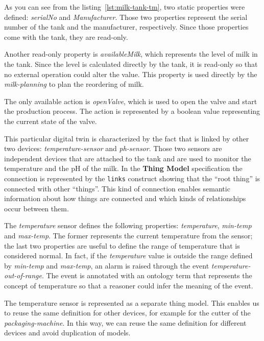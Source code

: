 

As you can see from the listing~\ref{lst:milk-tank-tm}, two static properties were defined: \textit{serialNo} and \textit{Manufacturer}.
Those two properties represent the serial number of the tank and the manufacturer, respectively.
Since those properties come with the tank, they are read-only.

Another read-only property is \textit{availableMilk}, which represents the level of milk in the tank. Since the level is calculated directly by the
tank, it is read-only so that no external operation could alter the value. This property is used directly by the \textit{milk-planning} to
plan the reordering of milk.

The only available action is \textit{openValve}, which is used to open the valve and start the production process. The action is represented by a boolean value representing the current state of the valve.

This particular digital twin is characterized by the fact that is linked by other two devices: \textit{temperature-sensor} and \textit{ph-sensor}.
Those two sensors are independent devices that are attached to the tank and are used to monitor the temperature and the pH of the milk.
In the \textbf{Thing Model} specification the connection is represented by the \texttt{links} construct showing that the ``root thing'' is connected
with other ``things''.
This kind of connection enables semantic information about how things are connected and which kinds of relationships occur between them.

The \textit{temperature} sensor defines the following properties: \textit{temperature}, \textit{min-temp} and \textit{max-temp}. The former represents the current temperature from the sensor; the last two properties are useful to define the range of temperature that is considered normal.
In fact, if the \textit{temperature} value is outside the range defined by \textit{min-temp} and \textit{max-temp}, an alarm is raised through the event \textit{temperature-out-of-range}. The event is annotated with an ontology term that represents the concept of temperature so that a reasoner
could infer the meaning of the event.

The temperature sensor is represented as a separate thing model. This enables us to reuse the same definition for other devices, for example for the
cutter of the \textit{packaging-machine}. In this way, we can reuse the same definition for different devices and avoid duplication of models.

